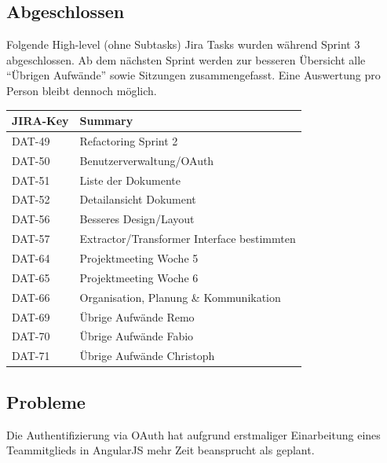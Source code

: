 \subsection*{Abgeschlossen}
Folgende High-level (ohne Subtasks) Jira Tasks wurden während Sprint 3 abgeschlossen. Ab dem nächsten Sprint werden zur besseren Übersicht alle ``Übrigen Aufwände'' sowie Sitzungen zusammengefasst. Eine Auswertung pro Person bleibt dennoch möglich.

\begin{table}[H]
\centering
\begin{tabular}{ll}
	\toprule
	\textbf{JIRA-Key} & \textbf{Summary}\\
	\midrule
DAT-49 & Refactoring Sprint 2\\
DAT-50 & Benutzerverwaltung/OAuth\\
DAT-51 & Liste der Dokumente\\
DAT-52 & Detailansicht Dokument\\
DAT-56 & Besseres Design/Layout\\
DAT-57 & Extractor/Transformer Interface bestimmten\\
DAT-64 & Projektmeeting Woche 5\\
DAT-65 & Projektmeeting Woche 6\\
DAT-66 & Organisation, Planung \& Kommunikation\\
DAT-69 & Übrige Aufwände Remo\\
DAT-70 & Übrige Aufwände Fabio\\
DAT-71 & Übrige Aufwände Christoph\\
	\bottomrule
\end{tabular}	
\end{table}

\subsection*{Probleme}
Die Authentifizierung via OAuth hat aufgrund erstmaliger Einarbeitung eines Teammitglieds in AngularJS mehr Zeit beansprucht als geplant.
